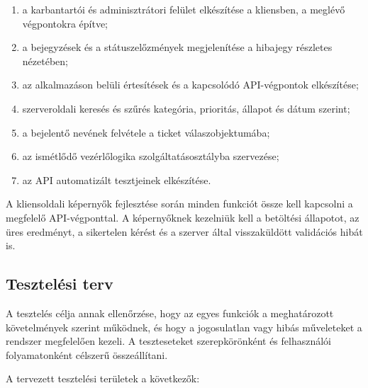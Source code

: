 \documentclass[12pt, a4paper, twoside]{article}
\begin{document}
\begin{enumerate}
    \item a karbantartói és adminisztrátori felület elkészítése a kliensben, a meglévő végpontokra építve;
    \item a bejegyzések és a státuszelőzmények megjelenítése a hibajegy részletes nézetében;
    \item az alkalmazáson belüli értesítések és a kapcsolódó API-végpontok elkészítése;
    \item szerveroldali keresés és szűrés kategória, prioritás, állapot és dátum szerint;
    \item a bejelentő nevének felvétele a ticket válaszobjektumába;
    \item az ismétlődő vezérlőlogika szolgáltatásosztályba szervezése;
    \item az API automatizált tesztjeinek elkészítése.
\end{enumerate}

A kliensoldali képernyők fejlesztése során minden funkciót össze kell kapcsolni a megfelelő API-végponttal. A képernyőknek kezelniük kell a betöltési állapotot, az üres eredményt, a sikertelen kérést és a szerver által visszaküldött validációs hibát is.

\subsection{Tesztelési terv}

A tesztelés célja annak ellenőrzése, hogy az egyes funkciók a meghatározott követelmények szerint működnek, és hogy a jogosulatlan vagy hibás műveleteket a rendszer megfelelően kezeli. A teszteseteket szerepkörönként és felhasználói folyamatonként célszerű összeállítani.

A tervezett tesztelési területek a következők:
\end{document}
